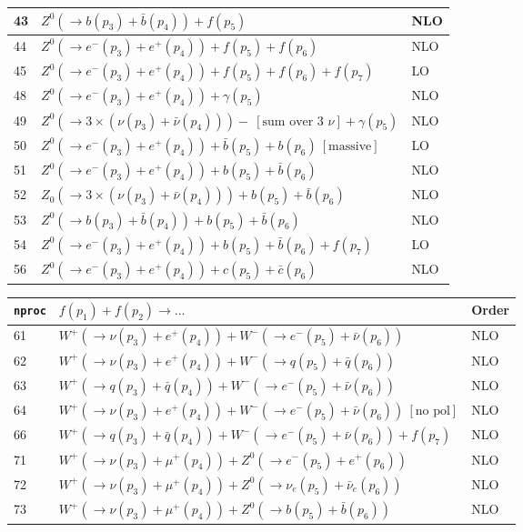 \documentclass[12pt]{article}
\begin{document}
\begin{itemize}
\begin{table}
\begin{center}
\begin{tabular}{|l|l|l|}
43& $ Z^0(\to b(p_3)+\bar{b}(p_4))+f(p_5) $ & NLO \\
\hline 
44& $ Z^0(\to e^-(p_3)+e^+(p_4))+f(p_5)+f(p_6) $ & NLO \\
45& $ Z^0(\to e^-(p_3)+e^+(p_4))+f(p_5)+f(p_6)+f(p_7) $ & LO \\
\hline 
48& $ Z^0(\to e^-(p_3)+e^+(p_4))+\gamma(p_5) $ & NLO \\
49& $ Z^0(\to 3\times(\nu(p_3)+\bar{\nu}(p_4)))-~[ \mbox{sum over 3 $\nu$} ]+\gamma(p_5) $ & NLO \\
\hline 
50& $ Z^0(\to e^-(p_3)+e^+(p_4))+\bar{b}(p_5)+b(p_6) ~[ \mbox{massive} ] $ & LO \\
51& $ Z^0(\to e^-(p_3)+e^+(p_4))+b(p_5)+\bar{b}(p_6) $ & NLO \\
52& $ Z_0(\to 3\times(\nu(p_3)+\bar{\nu}(p_4)))+b(p_5)+\bar{b}(p_6) $ & NLO \\
53& $ Z^0(\to b(p_3)+\bar{b}(p_4))+b(p_5)+\bar{b}(p_6) $ & NLO \\
54& $ Z^0(\to e^-(p_3)+e^+(p_4))+b(p_5)+\bar{b}(p_6)+f(p_7) $ & LO \\
\hline 
56& $ Z^0(\to e^-(p_3)+e^+(p_4))+c(p_5)+\bar{c}(p_6) $ & NLO \\
\hline 
\end{tabular}
\end{center}
\end{table}
\begin{table}
\begin{center}
\hspace*{-1.5cm}
\begin{tabular}{|l|l|l|}
\hline
{\tt nproc} & $ f(p_1)+f(p_2) \to \ldots $& Order \\ 
\hline
61& $ W^+(\to \nu(p_3)+e^+(p_4)) +W^-(\to e^-(p_5)+\bar{\nu}(p_6)) $ & NLO \\
62& $ W^+(\to \nu(p_3)+e^+(p_4)) +W^-(\to q(p_5)+\bar{q}(p_6)) $ & NLO \\
63& $ W^+(\to  q(p_3)+ \bar{q}(p_4)) +W^-(\to e^-(p_5)+\bar{\nu}(p_6)) $ & NLO \\
64& $ W^+(\to \nu(p_3)+e^+(p_4)) +W^-(\to e^-(p_5)+\bar{\nu}(p_6)) ~[ \mbox{no pol} ] $ & NLO \\
66& $ W^+(\to  q(p_3)+ \bar{q}(p_4)) +W^-(\to e^-(p_5)+\bar{\nu}(p_6))+f(p_7) $ & NLO \\
\hline 
71& $ W^+(\to \nu(p_3)+\mu^+(p_4))+Z^0(\to e^-(p_5)+e^+(p_6)) $ & NLO \\
72& $ W^+(\to \nu(p_3)+\mu^+(p_4))+Z^0(\to \nu_e(p_5)+\bar{\nu}_e(p_6)) $ & NLO \\
73& $ W^+(\to \nu(p_3)+\mu^+(p_4))+Z^0(\to b(p_5)+\bar{b}(p_6)) $ & NLO \\

\end{tabular}
\end{center}
\end{table}
\end{itemize}
\end{document}
